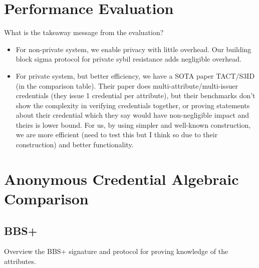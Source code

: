 {\section{Performance Evaluation}\label{sec:evaluation}
What is the takeaway message from the evaluation?
\begin{itemize}
    \item For non-private system, we enable privacy with little overhead. Our building block sigma protocol for private sybil resistance adds negligible overhead. 
    \item For private system, but better efficiency, we have a SOTA paper TACT/S3ID (in the comparison table). Their paper does multi-attribute/multi-issuer credentials (they issue 1 credential per attribute), but their benchmarks don't show the complexity in verifying credentials together, or proving statements about their credential which they say would have non-negligible impact and theirs is lower bound. For us, by using simpler and well-known construction, we are more efficient (need to test this but I think so due to their construction) and better functionality. 
\end{itemize}








\newpage
\section{Anonymous Credential Algebraic Comparison}

\subsection{BBS+}


Overview the BBS+ signature and protocol for proving knowledge of the attributes.


}
